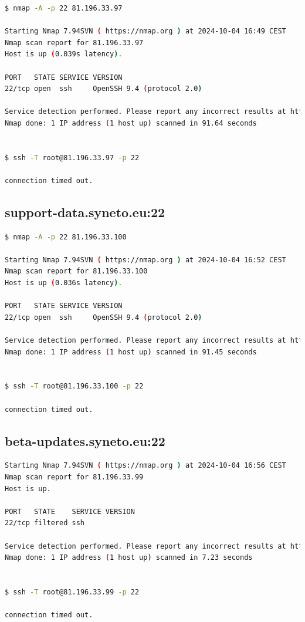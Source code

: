 \begin{lstlisting}[language=bash,breaklines=true,postbreak=\mbox{\textcolor{red}{$\hookrightarrow$}\space}]
$ nmap -A -p 22 81.196.33.97

Starting Nmap 7.94SVN ( https://nmap.org ) at 2024-10-04 16:49 CEST
Nmap scan report for 81.196.33.97
Host is up (0.039s latency).

PORT   STATE SERVICE VERSION
22/tcp open  ssh     OpenSSH 9.4 (protocol 2.0)

Service detection performed. Please report any incorrect results at https://nmap.org/submit/ .
Nmap done: 1 IP address (1 host up) scanned in 91.64 seconds


$ ssh -T root@81.196.33.97 -p 22

connection timed out.\end{lstlisting}

\subsection*{support-data.syneto.eu:22}

\begin{lstlisting}[language=bash,breaklines=true,postbreak=\mbox{\textcolor{red}{$\hookrightarrow$}\space}]
$ nmap -A -p 22 81.196.33.100

Starting Nmap 7.94SVN ( https://nmap.org ) at 2024-10-04 16:52 CEST
Nmap scan report for 81.196.33.100
Host is up (0.036s latency).

PORT   STATE SERVICE VERSION
22/tcp open  ssh     OpenSSH 9.4 (protocol 2.0)

Service detection performed. Please report any incorrect results at https://nmap.org/submit/ .
Nmap done: 1 IP address (1 host up) scanned in 91.45 seconds


$ ssh -T root@81.196.33.100 -p 22

connection timed out.\end{lstlisting}

\subsection*{beta-updates.syneto.eu:22}

\begin{lstlisting}[language=bash,breaklines=true,postbreak=\mbox{\textcolor{red}{$\hookrightarrow$}\space}]
Starting Nmap 7.94SVN ( https://nmap.org ) at 2024-10-04 16:56 CEST
Nmap scan report for 81.196.33.99
Host is up.

PORT   STATE    SERVICE VERSION
22/tcp filtered ssh

Service detection performed. Please report any incorrect results at https://nmap.org/submit/ .
Nmap done: 1 IP address (1 host up) scanned in 7.23 seconds


$ ssh -T root@81.196.33.99 -p 22

connection timed out.\end{lstlisting}

